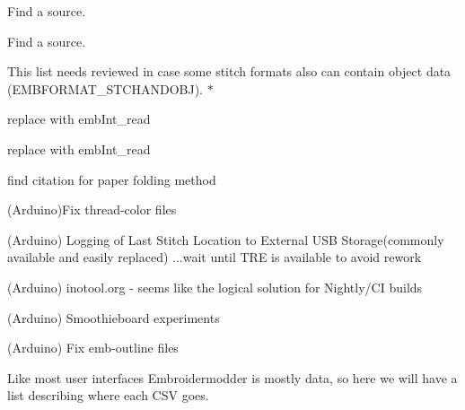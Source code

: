 \begin{DoxyRefList}
\label{todo__todo000216}%
%
Find a source.

\label{todo__todo000215}%
%
Find a source. 
\item[Member \mbox{\hyperlink{formats_8c_a8cb11404ce46501561f956d33f8dcf95}{format\+Table}} \mbox{[}number\+Of\+Formats\mbox{]}]\label{todo__todo000193}%
%
This list needs reviewed in case some stitch formats also can contain object data (EMBFORMAT\+\_\+\+STCHANDOBJ). $\ast$  
\item[Member \mbox{\hyperlink{formats_8c_a05fb50e7292226bc2947dd2b4da7a9bd}{fread\+\_\+int32\+\_\+be}} (FILE $\ast$f)]\label{todo__todo000195}%
%
replace with emb\+Int\+\_\+read  
\item[Member \mbox{\hyperlink{formats_8c_a2bcdb1e6bf6930d5c054ecdca9831eba}{fread\+\_\+uint16}} (FILE $\ast$f)]\label{todo__todo000194}%
%
replace with emb\+Int\+\_\+read  
\item[Member \mbox{\hyperlink{fill_8c_ad02b5d945eacff708d2bf084c40044d8}{generate\+\_\+dragon\+\_\+curve}} (char $\ast$state, int iterations)]\label{todo__todo000188}%
%
find citation for paper folding method  
\item[Page \mbox{\hyperlink{md_extern_libembroidery_src_geometry_geometry}{Geometry and Algorithms}} ]\label{todo__todo000207}%
%
(Arduino)Fix thread-\/color files

\label{todo__todo000208}%
%
(Arduino) Logging of Last Stitch Location to External USB Storage(commonly available and easily replaced) ...wait until TRE is available to avoid rework

\label{todo__todo000209}%
%
(Arduino) inotool.\+org -\/ seems like the logical solution for Nightly/\+CI builds

\label{todo__todo000210}%
%
(Arduino) Smoothieboard experiments

\label{todo__todo000206}%
%
(Arduino) Fix emb-\/outline files

\label{todo__todo000212}%
%
Like most user interfaces Embroidermodder is mostly data, so here we will have a list describing where each CSV goes.


\end{DoxyRefList}
